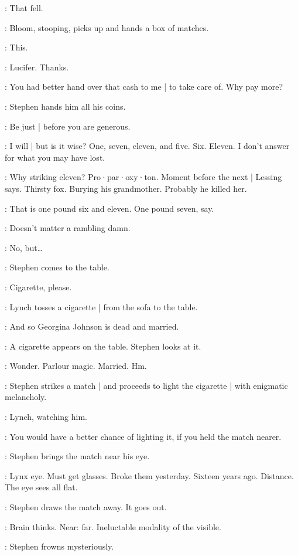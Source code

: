 \Stephen:
That fell.

:
Bloom,
stooping,
picks up and hands a box of matches.

\Bloom:
This.

\Stephen:
Lucifer.
Thanks.

\Bloom:
You had better hand over that cash to me |
to take care of.
Why pay more?

:
Stephen hands him all his coins.

\Stephen:
Be just |
before you are generous.

\Bloom:
I will |
but is it wise?
One,
seven,
eleven,
and five.
Six.
Eleven.
I don't answer for what you may have lost.

\Stephen:
Why striking eleven?
Pro·par·oxy·ton.
Moment before the next |
Lessing says.
Thirsty fox.
Burying his grandmother.
Probably he killed her.

\Bloom:
That is one pound six and eleven.
One pound seven,
say.

\Stephen:
Doesn't matter a rambling damn.

\Bloom:
No,
but…

:
Stephen comes to the table.

\Stephen:
Cigarette,
please.

:
Lynch tosses a cigarette |
from the sofa to the table.

\Stephen:
And so Georgina Johnson is dead and married.

:
A cigarette appears on the table.
Stephen looks at it.

\Stephen:
Wonder.
Parlour magic.
Married.
Hm.

:
Stephen strikes a match |
and proceeds to light the cigarette |
with enigmatic melancholy.

:
Lynch,
watching him.

\Lynch:
You would have a better chance of lighting it,
if you held the match nearer.

:
Stephen brings the match near his eye.

\Stephen:
Lynx eye.
Must get glasses.
Broke them yesterday.
Sixteen years ago.
Distance.
The eye sees all flat.

:
Stephen draws the match away.
It goes out.

\Stephen:
Brain thinks.
Near:
far.
Ineluctable modality of the visible.

:
Stephen frowns mysteriously.


